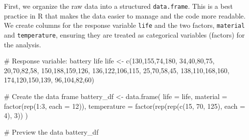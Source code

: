 \documentclass[
  letterpaper,
]{scrbook}
\newenvironment{Shaded}{\begin{snugshade}}{\end{snugshade}}
\newcommand{\AttributeTok}[1]{\textcolor[rgb]{0.40,0.45,0.13}{#1}}
\newcommand{\CommentTok}[1]{\textcolor[rgb]{0.37,0.37,0.37}{#1}}
\newcommand{\DecValTok}[1]{\textcolor[rgb]{0.68,0.00,0.00}{#1}}
\newcommand{\FunctionTok}[1]{\textcolor[rgb]{0.28,0.35,0.67}{#1}}
\newcommand{\NormalTok}[1]{\textcolor[rgb]{0.00,0.23,0.31}{#1}}
\newcommand{\OtherTok}[1]{\textcolor[rgb]{0.00,0.23,0.31}{#1}}
\newcommand{\SpecialCharTok}[1]{\textcolor[rgb]{0.37,0.37,0.37}{#1}}
\begin{document}
First, we organize the raw data into a structured \texttt{data.frame}.
This is a best practice in R that makes the data easier to manage and
the code more readable. We create columns for the response variable
\texttt{life} and the two factors, \texttt{material} and
\texttt{temperature}, ensuring they are treated as categorical variables
(factors) for the analysis.

\begin{Shaded}
\begin{Highlighting}[]
\CommentTok{\# Response variable: battery life}
\NormalTok{life }\OtherTok{\textless{}{-}} \FunctionTok{c}\NormalTok{(}\DecValTok{130}\NormalTok{,}\DecValTok{155}\NormalTok{,}\DecValTok{74}\NormalTok{,}\DecValTok{180}\NormalTok{,  }\DecValTok{34}\NormalTok{,}\DecValTok{40}\NormalTok{,}\DecValTok{80}\NormalTok{,}\DecValTok{75}\NormalTok{,   }\DecValTok{20}\NormalTok{,}\DecValTok{70}\NormalTok{,}\DecValTok{82}\NormalTok{,}\DecValTok{58}\NormalTok{,}
          \DecValTok{150}\NormalTok{,}\DecValTok{188}\NormalTok{,}\DecValTok{159}\NormalTok{,}\DecValTok{126}\NormalTok{, }\DecValTok{136}\NormalTok{,}\DecValTok{122}\NormalTok{,}\DecValTok{106}\NormalTok{,}\DecValTok{115}\NormalTok{, }\DecValTok{25}\NormalTok{,}\DecValTok{70}\NormalTok{,}\DecValTok{58}\NormalTok{,}\DecValTok{45}\NormalTok{,}
          \DecValTok{138}\NormalTok{,}\DecValTok{110}\NormalTok{,}\DecValTok{168}\NormalTok{,}\DecValTok{160}\NormalTok{, }\DecValTok{174}\NormalTok{,}\DecValTok{120}\NormalTok{,}\DecValTok{150}\NormalTok{,}\DecValTok{139}\NormalTok{, }\DecValTok{96}\NormalTok{,}\DecValTok{104}\NormalTok{,}\DecValTok{82}\NormalTok{,}\DecValTok{60}\NormalTok{)}

\CommentTok{\# Create the data frame}
\NormalTok{battery\_df }\OtherTok{\textless{}{-}} \FunctionTok{data.frame}\NormalTok{(}
  \AttributeTok{life =}\NormalTok{ life,}
  \AttributeTok{material =} \FunctionTok{factor}\NormalTok{(}\FunctionTok{rep}\NormalTok{(}\DecValTok{1}\SpecialCharTok{:}\DecValTok{3}\NormalTok{, }\AttributeTok{each =} \DecValTok{12}\NormalTok{)),}
  \AttributeTok{temperature =} \FunctionTok{factor}\NormalTok{(}\FunctionTok{rep}\NormalTok{(}\FunctionTok{rep}\NormalTok{(}\FunctionTok{c}\NormalTok{(}\DecValTok{15}\NormalTok{, }\DecValTok{70}\NormalTok{, }\DecValTok{125}\NormalTok{), }\AttributeTok{each =} \DecValTok{4}\NormalTok{), }\DecValTok{3}\NormalTok{))}
\NormalTok{)}

\CommentTok{\# Preview the data}
\NormalTok{battery\_df}
\end{Highlighting}
\end{Shaded}
\end{document}
